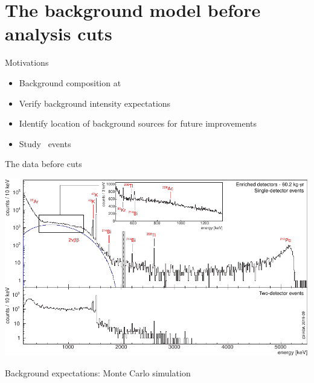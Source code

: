 \documentclass[10pt,aspectratio=169]{beamer}
\begin{document}
\section{The background model before analysis cuts}
\begin{frame}{Motivations}
  \begin{itemize}
    \item Background composition at \qbb
    \item Verify background intensity expectations
    \item Identify location of background sources for future improvements
    \item Study \nnbb\ events
  \end{itemize}
\end{frame}
\begin{frame}[plain]{The data before cuts}
  \begin{center}
    \includegraphics[height=0.95\textheight]{plots/bkg/raw/ph2/dataGe-desc.pdf}
  \end{center}
\end{frame}
\begin{frame}{Background expectations: Monte Carlo simulation}
  \begin{center}
  \end{center}
\end{frame}
\end{document}
